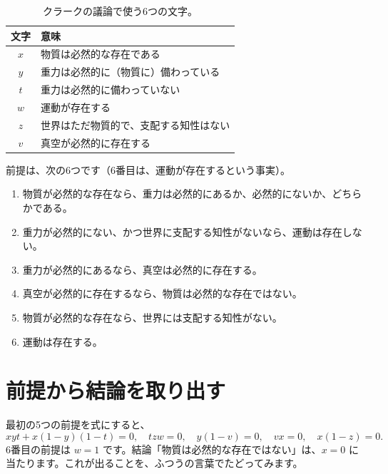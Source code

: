 \documentclass[a4paper,11pt,openany]{ltjsbook}
\begin{document}
\begin{table}[htbp]
\centering
\begin{tabular}{cl}
\toprule
文字 & 意味\\
\midrule
$x$ & 物質は必然的な存在である\\
$y$ & 重力は必然的に（物質に）備わっている\\
$t$ & 重力は必然的に備わっていない\\
$w$ & 運動が存在する\\
$z$ & 世界はただ物質的で、支配する知性はない\\
$v$ & 真空が必然的に存在する\\
\bottomrule
\end{tabular}
\caption{クラークの議論で使う6つの文字。}
\end{table}

前提は、次の6つです（6番目は、運動が存在するという事実）。

\begin{enumerate}[leftmargin=*]
\item 物質が必然的な存在なら、重力は必然的にあるか、必然的にないか、どちらかである。
\item 重力が必然的にない、かつ世界に支配する知性がないなら、運動は存在しない。
\item 重力が必然的にあるなら、真空は必然的に存在する。
\item 真空が必然的に存在するなら、物質は必然的な存在ではない。
\item 物質が必然的な存在なら、世界には支配する知性がない。
\item 運動は存在する。
\end{enumerate}

\section{前提から結論を取り出す}

最初の5つの前提を式にすると、
\[
xyt+x(1-y)(1-t)=0,\quad tzw=0,\quad y(1-v)=0,\quad vx=0,\quad x(1-z)=0 .
\]
6番目の前提は $w=1$ です。結論「物質は必然的な存在ではない」は、$x=0$ に当たります。これが出ることを、ふつうの言葉でたどってみます。
\end{document}
